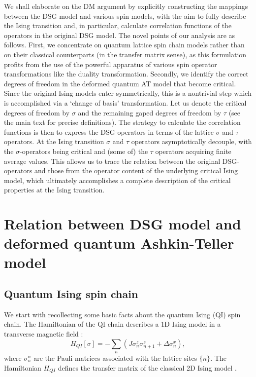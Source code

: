 We shall elaborate on the DM argument
by explicitly constructing the mappings between the
DSG model and various spin models, with the aim to
fully describe the Ising transition and, in particular,
calculate correlation functions
of the operators in the original DSG model.
The novel points of our analysis are as follows.
First, we concentrate on quantum lattice spin chain
models
rather than on their classical counterparts
(in the transfer matrix sense), as this formulation
profits from the use of the powerful apparatus
of various spin operator transformations like
the duality transformation.
Secondly, we identify the correct degrees of freedom in
the deformed quantum AT model
that become critical.
Since the original Ising models enter symmetrically,
this is a nontrivial step
which is accomplished via a `change of basis'
transformation. Let us denote the critical degrees of freedom by
$\sigma$ and the remaining gaped degrees of freedom
by $\tau$ (see the main text for precise definitions).
The strategy to calculate the correlation functions
is then to express the DSG-operators in terms of
the lattice $\sigma$ and $\tau$ operators. At the Ising transition
$\sigma$ and $\tau$ operators asymptotically decouple,
with the $\sigma$-operators being critical and (some of)
the $\tau$ operators acquiring finite average values.
This allows us to trace the relation
between the original DSG-operators and those
from the operator content of the underlying
critical Ising model, which ultimately accomplishes a
complete description of the critical properties at the
Ising transition.

\section{Relation between DSG model and deformed quantum Ashkin-Teller model}

\subsection{Quantum Ising spin chain}

We start with recollecting some basic facts about the
quantum Ising (QI) spin chain. The Hamiltonian of the QI chain
describes a 1D Ising model in a transverse magnetic
field \cite{Pf}:
\begin{equation}
H_{QI}[\sigma]=-\sum_n\left(J\sigma^z_n\sigma^z_{n+1}+\Delta \sigma^x_n
\right),
\label{QI}
\end{equation}
where $\sigma^{\alpha}_n$ are the Pauli matrices associated with the lattice sites
$\{n \}$. The Hamiltonian $H_{QI}$ defines the transfer
matrix of the classical 2D Ising model
\cite{LSM}.

